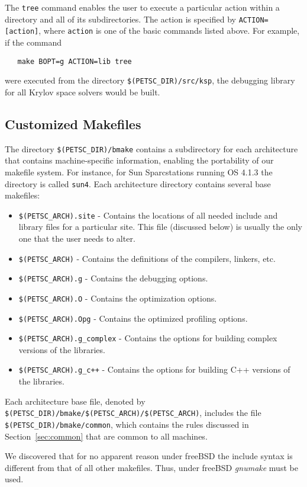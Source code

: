 The {\tt tree} command enables the user to execute a particular action
within a directory and all of its subdirectories.  The action is specified
by {\tt ACTION=[action]}, where {\tt action} is one of the basic commands
listed above. For example, if the command
\begin{verbatim}
   make BOPT=g ACTION=lib tree
\end{verbatim}
were executed from the directory {\tt \$(PETSC\_DIR)/src/ksp},
the debugging library for all Krylov space solvers would be built.

\subsection{Customized Makefiles}
\label{sec:custom}

The directory {\tt \$(PETSC\_DIR)/bmake} contains a subdirectory for each 
architecture that contains machine-specific information, enabling the
portability of our makefile system.
For instance, for Sun Sparcstations running OS 4.1.3 the 
directory is called {\tt sun4}.  Each architecture directory contains
several base makefiles:
\begin{itemize}
\item {\tt \$(PETSC\_ARCH).site} - Contains the locations of all needed include
      and library files for a particular site. This file (discussed
      below) is usually the only one that the user needs to alter.
\item {\tt \$(PETSC\_ARCH)} - Contains the definitions of the compilers,
      linkers, etc.
\item {\tt \$(PETSC\_ARCH).g} - Contains the debugging options.
\item {\tt \$(PETSC\_ARCH).O} - Contains the optimization options.
\item {\tt \$(PETSC\_ARCH).Opg} - Contains the optimized profiling options.
\item {\tt \$(PETSC\_ARCH).g\_complex} - Contains the options for building
      complex versions of the libraries.
\item {\tt \$(PETSC\_ARCH).g\_c++} - Contains the options for building C++ 
      versions of the libraries.
\end{itemize}
Each architecture base file, denoted by
{\tt \$(PETSC\_DIR)/bmake/\$(PETSC\_ARCH)/\$(PETSC\_ARCH)},
includes the file {\tt \$(PETSC\_DIR)/bmake/common},
which contains the rules discussed in Section~\ref{sec:common}
that are common to all machines.

\begin{design}
We discovered that for no apparent reason under freeBSD the include 
syntax is different from that of all other makefiles. Thus, under 
freeBSD {\em gnumake} must be used.
\end{design}

